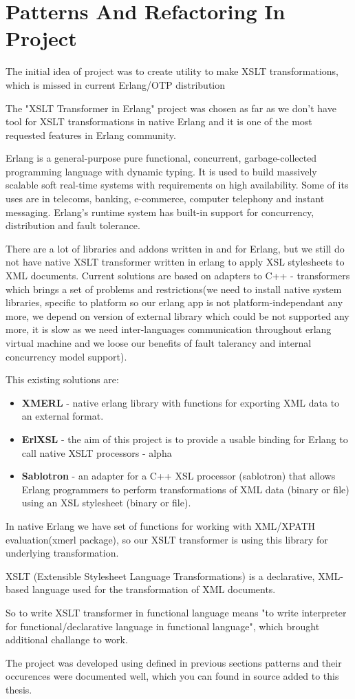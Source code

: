 \chapter{Patterns And Refactoring In Project}

The initial idea of project was to create utility to make XSLT transformations, which is missed in current Erlang/OTP distribution

The "XSLT Transformer in Erlang" project was chosen as far as we don't have tool for XSLT transformations in native Erlang and it is one of the most requested features in Erlang community.

Erlang is a general-purpose pure functional, concurrent, garbage-collected programming language with dynamic typing. It is used to build massively scalable soft real-time systems with requirements on high availability. Some of its uses are in telecoms, banking, e-commerce, computer telephony and instant messaging. Erlang's runtime system has built-in support for concurrency, distribution and fault tolerance.

There are a lot of libraries and addons written in and for Erlang, but we still do not have native XSLT transformer written in erlang to apply XSL stylesheets to XML documents. Current solutions are based on adapters to C++ - transformers which brings a set of problems and restrictions(we need to install native system libraries, specific to platform so our erlang app is not platform-independant any more, we depend on version of external library which could be not supported any more, it is slow as we need inter-languages communication throughout erlang virtual machine and we loose our benefits of fault talerancy and internal concurrency model support).

This existing solutions are:
\begin{itemize}
	\item \textbf{XMERL} - native erlang library with functions for exporting XML data to an external format.
	\item \textbf{ErlXSL} - the aim of this project is to provide a usable binding for Erlang to call native XSLT processors - alpha 
	\item \textbf{Sablotron} - an adapter for a C++ XSL processor (sablotron) that allows Erlang programmers to perform transformations of XML data (binary or file) using an XSL stylesheet (binary or file).
\end{itemize}

In native Erlang we have set of functions for working with XML/XPATH evaluation(xmerl package), so our XSLT transformer is using this library for underlying transformation.

XSLT (Extensible Stylesheet Language Transformations) is a declarative, XML-based language used for the transformation of XML documents.

So to write XSLT transformer in functional language means "to write interpreter for functional/declarative language in functional language", which brought additional challange to work.

The project was developed using defined in previous sections patterns and their occurences were documented well, which you can found in source added to this thesis.
